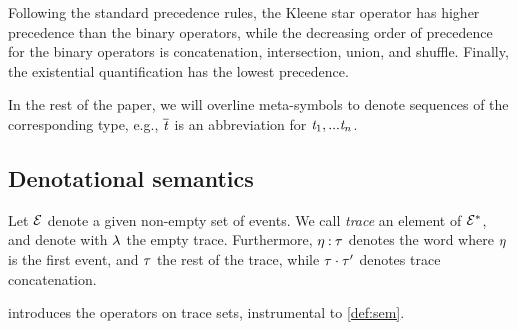Following the standard precedence rules, the Kleene star operator has higher precedence than the binary operators, while the decreasing order of precedence for the binary operators is concatenation, intersection, union, and shuffle.
Finally, the existential quantification has the lowest precedence.

In the rest of the paper, we will overline meta-symbols to denote sequences of the corresponding type, e.g., $\overline{\mathit {t}}$ is an abbreviation for $\mathit {t}_1,...\mathit {t}_n $.


\subsection{Denotational semantics}
Let $\mathcal{E}$ denote a given non-empty set of events. We call \emph{trace} an element of $\mathcal{E}^*$, and denote with $\lambda$ the empty trace. Furthermore, $\eta\mathbin{:}\tau$ denotes the word where $\eta$ is the first event, and $\tau$ the rest of the trace, while $\tau\mathbin{\cdot}\tau'$ denotes trace concatenation.

 introduces the operators on trace sets, instrumental to \cref{def:sem}.

